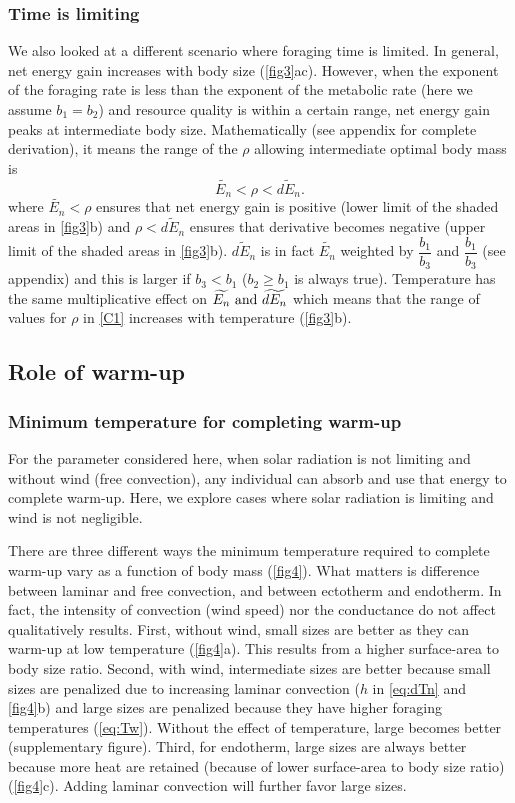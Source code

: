 \subsubsection*{Time is limiting}
We also looked at a different scenario where foraging time is limited.
In general, net energy gain increases with body size (\cref{fig3}ac).
However, when the exponent of the foraging rate is less than the exponent of the metabolic rate (here we assume $b_1 =b_2$) and resource quality is within a certain range,  net energy gain peaks at intermediate body size.
Mathematically (see appendix for complete derivation), it means the range of the $\rho$ allowing intermediate optimal body mass is 
\begin{equation}\label{C1}
	\widetilde{E_n} < \rho < \widetilde{dE_n}.
\end{equation}
where $\widetilde{E_n} < \rho $ ensures that net energy gain is positive (lower limit of the shaded areas in \cref{fig3}b) and $\rho < \widetilde{dE_n}$ ensures that derivative becomes negative (upper limit of the shaded areas in \cref{fig3}b).
$\widetilde{dE_n}$ is in fact $\widetilde{E_n}$ weighted by $\dfrac{b_1}{b_3}$  and $\dfrac{b_1}{b_3}$ (see appendix) and this is larger if  $b_3 < b_1$ ($b_2 \geq b_1$ is always true). 
Temperature has the same multiplicative effect on $\widetilde{E_n}\textnormal{ and }\widetilde{dE_n}$ which means that the range of values for $\rho$ in \cref{C1} increases with temperature (\cref{fig3}b).
\subsection*{Role of warm-up}
\subsubsection*{Minimum temperature for completing warm-up}
For the parameter considered here, when solar radiation is not limiting and without wind (free convection), any individual can absorb and use that energy to complete warm-up.
Here, we explore cases where solar radiation is limiting and wind is not negligible.

There are three different ways the minimum temperature required to complete warm-up vary as a function of body mass (\cref{fig4}).
What matters is difference between laminar and free convection, and between ectotherm  and endotherm. 
In fact, the intensity of convection (wind speed) nor the conductance do not affect qualitatively results.
First, without wind, small sizes are better as they can warm-up at low temperature (\cref{fig4}a).
This results from a higher surface-area to body size ratio.
Second, with wind, intermediate sizes are better because small sizes are penalized due to increasing laminar convection ($h$ in \cref{eq:dTn} and \cref{fig4}b)  and large sizes are penalized because they have higher foraging temperatures (\cref{eq:Tw}). 
Without the effect of temperature, large becomes better (supplementary figure).
Third, for endotherm, large sizes are always better because more heat are retained (because of lower surface-area to body size ratio) (\cref{fig4}c).
Adding laminar convection will further favor large sizes.
